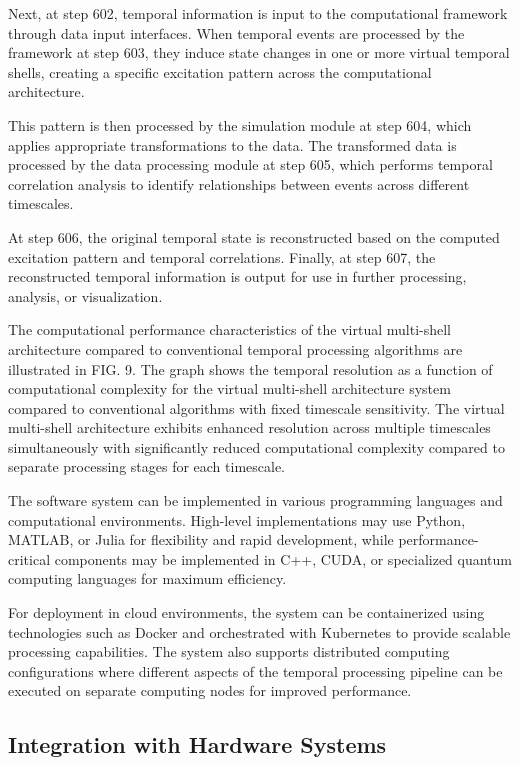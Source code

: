 \documentclass[12pt,letterpaper]{article}
\begin{document}
Next, at step 602, temporal information is input to the computational framework through data input interfaces. When temporal events are processed by the framework at step 603, they induce state changes in one or more virtual temporal shells, creating a specific excitation pattern across the computational architecture.

This pattern is then processed by the simulation module at step 604, which applies appropriate transformations to the data. The transformed data is processed by the data processing module at step 605, which performs temporal correlation analysis to identify relationships between events across different timescales.

At step 606, the original temporal state is reconstructed based on the computed excitation pattern and temporal correlations. Finally, at step 607, the reconstructed temporal information is output for use in further processing, analysis, or visualization.

The computational performance characteristics of the virtual multi-shell architecture compared to conventional temporal processing algorithms are illustrated in FIG. 9. The graph shows the temporal resolution as a function of computational complexity for the virtual multi-shell architecture system compared to conventional algorithms with fixed timescale sensitivity. The virtual multi-shell architecture exhibits enhanced resolution across multiple timescales simultaneously with significantly reduced computational complexity compared to separate processing stages for each timescale.

The software system can be implemented in various programming languages and computational environments. High-level implementations may use Python, MATLAB, or Julia for flexibility and rapid development, while performance-critical components may be implemented in C++, CUDA, or specialized quantum computing languages for maximum efficiency.

For deployment in cloud environments, the system can be containerized using technologies such as Docker and orchestrated with Kubernetes to provide scalable processing capabilities. The system also supports distributed computing configurations where different aspects of the temporal processing pipeline can be executed on separate computing nodes for improved performance.

\subsection{Integration with Hardware Systems}
\end{document}

